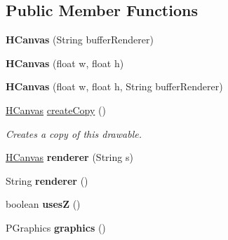 \subsection*{Public Member Functions}
\begin{DoxyCompactItemize}
\item 
\hypertarget{classhype_1_1drawable_1_1_h_canvas_a7d573c3963fd1fcabdc026e5b29f0831}{{\bfseries H\-Canvas} (String buffer\-Renderer)}\label{classhype_1_1drawable_1_1_h_canvas_a7d573c3963fd1fcabdc026e5b29f0831}

\item 
\hypertarget{classhype_1_1drawable_1_1_h_canvas_a81857335bcf9b8fad8a5e5a47ce39890}{{\bfseries H\-Canvas} (float w, float h)}\label{classhype_1_1drawable_1_1_h_canvas_a81857335bcf9b8fad8a5e5a47ce39890}

\item 
\hypertarget{classhype_1_1drawable_1_1_h_canvas_a838ebf70002399a4459ada84f792ef89}{{\bfseries H\-Canvas} (float w, float h, String buffer\-Renderer)}\label{classhype_1_1drawable_1_1_h_canvas_a838ebf70002399a4459ada84f792ef89}

\item 
\hyperlink{classhype_1_1drawable_1_1_h_canvas}{H\-Canvas} \hyperlink{classhype_1_1drawable_1_1_h_canvas_a908f9a44d52db58cb91cd6de3e9ff5c2}{create\-Copy} ()
\begin{DoxyCompactList}\small\item\em Creates a copy of this drawable. \end{DoxyCompactList}\item 
\hypertarget{classhype_1_1drawable_1_1_h_canvas_a22d679cbf7f9c63de35f9c9a8dba532a}{\hyperlink{classhype_1_1drawable_1_1_h_canvas}{H\-Canvas} {\bfseries renderer} (String s)}\label{classhype_1_1drawable_1_1_h_canvas_a22d679cbf7f9c63de35f9c9a8dba532a}

\item 
\hypertarget{classhype_1_1drawable_1_1_h_canvas_aab3cd5e88afcc34afc38ace3ffcbf2ed}{String {\bfseries renderer} ()}\label{classhype_1_1drawable_1_1_h_canvas_aab3cd5e88afcc34afc38ace3ffcbf2ed}

\item 
\hypertarget{classhype_1_1drawable_1_1_h_canvas_a9568a4eaab025dfd2fe66e68c9ef1d01}{boolean {\bfseries uses\-Z} ()}\label{classhype_1_1drawable_1_1_h_canvas_a9568a4eaab025dfd2fe66e68c9ef1d01}

\item 
\hypertarget{classhype_1_1drawable_1_1_h_canvas_a4dfb72be531c1dbb845770db1277f807}{P\-Graphics {\bfseries graphics} ()}\label{classhype_1_1drawable_1_1_h_canvas_a4dfb72be531c1dbb845770db1277f807}


\end{DoxyCompactItemize}
